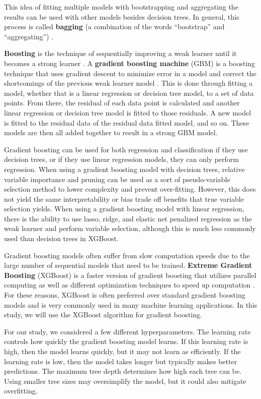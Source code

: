 \documentclass{article}
\begin{document}
This idea of fitting multiple models with bootstrapping and aggregating the results can be used with other models besides decision trees. In general, this process is called \textbf{bagging} (a combination of the words ``bootstrap'' and ``aggregating'') \cite{breiman1996bagging}. 

\textbf{Boosting} is the technique of sequentially improving a weak learner until it becomes a strong learner \cite{schapire1990strength}. A \textbf{gradient boosting machine} (GBM) is a boosting technique that uses gradient descent to minimize error in a model and correct the shortcomings of the previous weak learner model \cite{friedman2001greedy}. This is done through fitting a model, whether that is a linear regression or decision tree model, to a set of data points. From there, the residual of each data point is calculated and another linear regression or decision tree model is fitted to those residuals. A new model is fitted to the residual data of the residual data fitted model, and so on. These models are then all added together to result in a strong GBM model.

Gradient boosting can be used for both regression and classification if they use decision trees, or if they use linear regression models, they can only perform regression. When using a gradient boosting model with decision trees, relative variable importance and pruning can be used as a sort of pseudo-variable selection method to lower complexity and prevent over-fitting. However, this does not yield the same interpretability or bias trade off benefits that true variable selection yields. When using a gradient boosting model with linear regression, there is the ability to use lasso, ridge, and elastic net penalized regression as the weak learner and perform variable selection, although this is much less commonly used than decision trees in XGBoost.

Gradient boosting models often suffer from slow computation speeds due to the large number of sequential models that need to be trained. \textbf{Extreme Gradient Boosting} (XGBoost) is a faster version of gradient boosting that utilizes parallel computing as well as different optimization techniques to speed up computation \cite{chen2016xgboost}. For these reasons, XGBoost is often preferred over standard gradient boosting models and is very commonly used in many machine learning applications. In this study, we will use the XGBoost algorithm for gradient boosting.

For our study, we considered a few different hyperparameters. The learning rate controls how quickly the gradient boosting model learns. If this learning rate is high, then the model learns quickly, but it may not learn as efficiently. If the learning rate is low, then the model takes longer but typically makes better predictions. The maximum tree depth determines how high each tree can be. Using smaller tree sizes may oversimplify the model, but it could also mitigate overfitting.
\end{document}

